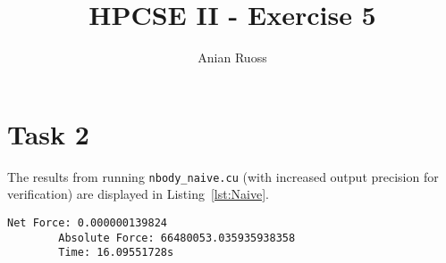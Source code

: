 \documentclass[11pt]{article}
\begin{document}
    \title{HPCSE II - Exercise 5}
    \author{Anian Ruoss}
    \maketitle

    \section*{Task 2}
    \label{sec:Task2}

    The results from running \texttt{nbody\_naive.cu} (with increased output
    precision for verification) are displayed in Listing~\ref{lst:Naive}.

    \begin{lstlisting}[basicstyle=\scriptsize, frame=single, caption={Output
    from running \texttt{nbody\_naive.cu}.}, label={lst:Naive}]
        Net Force: 0.000000139824
        Absolute Force: 66480053.035935938358
        Time: 16.09551728s
    \end{lstlisting}
\end{document}

